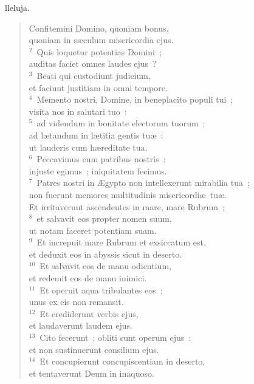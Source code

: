 \bchapter
{}lleluja. \begin{flushleft}\begin{verse}\vspace{6pt}Confitemini Domino, quoniam bonus,\\ quoniam in s\ae culum misericordia ejus.\\
${}^{2}$~Quis loquetur potentias Domini~;\\ auditas faciet omnes laudes ejus~?\\
${}^{3}$~Beati qui custodiunt judicium,\\ et faciunt justitiam in omni tempore.\\
${}^{4}$~Memento nostri, Domine, in beneplacito populi tui~;\\ visita nos in salutari tuo~:\\
${}^{5}$~ad videndum in bonitate electorum tuorum~;\\ ad l\ae tandum in l\ae titia gentis tu\ae~:\\ ut lauderis cum h\ae reditate tua.\\
${}^{6}$~Peccavimus cum patribus nostris~:\\ injuste egimus~; iniquitatem fecimus.\\
${}^{7}$~Patres nostri in \AE gypto non intellexerunt mirabilia tua~;\\ non fuerunt memores multitudinis misericordi\ae\ tu\ae .\\ Et irritaverunt ascendentes in mare, mare Rubrum~;\\
${}^{8}$~et salvavit eos propter nomen suum,\\ ut notam faceret potentiam suam.\\
${}^{9}$~Et increpuit mare Rubrum et exsiccatum est,\\ et deduxit eos in abyssis sicut in deserto.\\
${}^{10}$~Et salvavit eos de manu odientium,\\ et redemit eos de manu inimici.\\
${}^{11}$~Et operuit aqua tribulantes eos~;\\ unus ex eis non remansit.\\
${}^{12}$~Et crediderunt verbis ejus,\\ et laudaverunt laudem ejus.\\
${}^{13}$~Cito fecerunt~; obliti sunt operum ejus~:\\ et non sustinuerunt consilium ejus.\\
${}^{14}$~Et concupierunt concupiscentiam in deserto,\\ et tentaverunt Deum in inaquoso.\\

\end{verse}
\end{flushleft}
